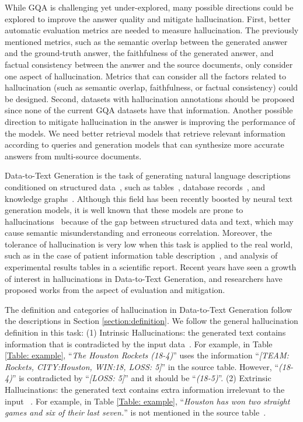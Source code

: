 
While GQA is challenging yet under-explored, many possible directions could be explored to improve the answer quality and mitigate hallucination. 
First, better automatic evaluation metrics are needed to measure hallucination. The previously mentioned metrics, such as the semantic overlap between the generated answer and the ground-truth answer, the faithfulness of the generated answer, and factual consistency between the answer and the source documents, only consider one aspect of hallucination. Metrics that can consider all the factors related to hallucination (such as semantic overlap, faithfulness, or factual consistency) could be designed. 
Second, datasets with hallucination annotations should be proposed since none of the current GQA datasets have that information. Another possible direction to mitigate hallucination in the answer is improving the performance of the models. We need better retrieval models that retrieve relevant information according to queries and generation models that can synthesize more accurate answers from multi-source documents.

\label{section:data2text}
Data-to-Text Generation is the task of generating natural language descriptions conditioned on structured data~, such as tables~, database records~, and knowledge graphs~.
Although this field has been recently boosted by neural text generation models, it is well known that these models are prone to hallucinations~ because of the gap between structured data and text, which may cause semantic misunderstanding and erroneous correlation.
Moreover, the tolerance of hallucination is very low when this task is applied to the real world, such as in the case of patient information table description~, and analysis of experimental results tables in a scientific report.
Recent years have seen a growth of interest in hallucinations in Data-to-Text Generation, and researchers have proposed works from the aspect of evaluation and mitigation.

The definition and categories of hallucination in Data-to-Text Generation follow the descriptions in Section \ref{section:definition}. We follow the general hallucination definition in this task:
(1) Intrinsic Hallucinations: the generated text contains information that is contradicted by the input data~. For example, in Table \ref{Table: example}, ``\textit{The Houston Rockets (18-4)}'' uses the information ``\textit{[TEAM: Rockets, CITY:Houston, WIN:18, LOSS: 5]}'' in the source table. However, ``\textit{(18-4)}'' is contradicted by ``\textit{[LOSS: 5]}'' and it should be ``\textit{(18-5)}''.
(2) Extrinsic Hallucinations: the generated text contains extra information irrelevant to the input ~. For example, in Table \ref{Table: example}, ``\textit{Houston has won two straight games and six of their last seven.}'' is not mentioned in the source table~.



